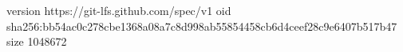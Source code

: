 version https://git-lfs.github.com/spec/v1
oid sha256:bb54ac0c278cbe1368a08a7c8d998ab55854458cb6d4ceef28c9e6407b517b47
size 1048672
